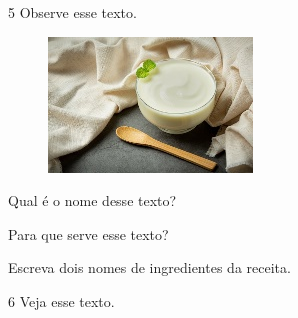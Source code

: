 
\pagebreak
\num{5} Observe esse texto.


\begin{figure}[htpb!]
\includegraphics[width=\textwidth]{media/image106.jpeg}
\end{figure}


\begin{escolha}
\item Qual é o nome desse texto?


\item Para que serve esse texto?


\item Escreva dois nomes de ingredientes da receita.

\end{escolha}

\pagebreak
\num{6} Veja esse texto.


